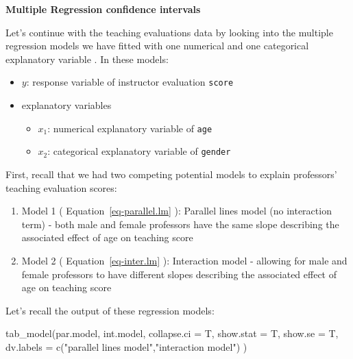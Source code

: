 \documentclass[
  letterpaper,
  DIV=11,
  numbers=noendperiod]{scrartcl}
\newenvironment{Shaded}{\begin{snugshade}}{\end{snugshade}}
\newcommand{\AttributeTok}[1]{\textcolor[rgb]{0.40,0.45,0.13}{#1}}
\newcommand{\FunctionTok}[1]{\textcolor[rgb]{0.28,0.35,0.67}{#1}}
\newcommand{\NormalTok}[1]{\textcolor[rgb]{0.00,0.23,0.31}{#1}}
\newcommand{\StringTok}[1]{\textcolor[rgb]{0.13,0.47,0.30}{#1}}
\providecommand{\tightlist}{%
  \setlength{\itemsep}{0pt}\setlength{\parskip}{0pt}}\usepackage{longtable,booktabs,array}
\begin{document}
\begin{tcolorbox}
\end{tcolorbox}

\textbf{Multiple Regression confidence intervals}

Let's continue with the teaching evaluations data by looking into the
multiple regression models we have fitted with one numerical and one
categorical explanatory variable . In these models:

\begin{itemize}
\tightlist
\item
  \(y\): response variable of instructor evaluation \texttt{score}
\item
  explanatory variables

  \begin{itemize}
  \tightlist
  \item
    \(x_1\): numerical explanatory variable of \texttt{age}
  \item
    \(x_2\): categorical explanatory variable of \texttt{gender}
  \end{itemize}
\end{itemize}

First, recall that we had two competing potential models to explain
professors' teaching evaluation scores:

\begin{enumerate}
\def\labelenumi{\arabic{enumi}.}
\tightlist
\item
  Model 1 ( Equation~\ref{eq-parallel.lm} ): Parallel lines model (no
  interaction term) - both male and female professors have the same
  slope describing the associated effect of age on teaching score
\item
  Model 2 ( Equation~\ref{eq-inter.lm} ): Interaction model - allowing
  for male and female professors to have different slopes describing the
  associated effect of age on teaching score
\end{enumerate}

Let's recall the output of these regression models:

\begin{Shaded}
\begin{Highlighting}[]
\FunctionTok{tab\_model}\NormalTok{(par.model,}
\NormalTok{          int.model,}
          \AttributeTok{collapse.ci =}\NormalTok{ T,}
          \AttributeTok{show.stat =}\NormalTok{ T,}
          \AttributeTok{show.se =}\NormalTok{ T,}
          \AttributeTok{dv.labels =} \FunctionTok{c}\NormalTok{(}\StringTok{"parallel lines model"}\NormalTok{,}\StringTok{"interaction model"}\NormalTok{) )}
\end{Highlighting}
\end{Shaded}
\end{document}
